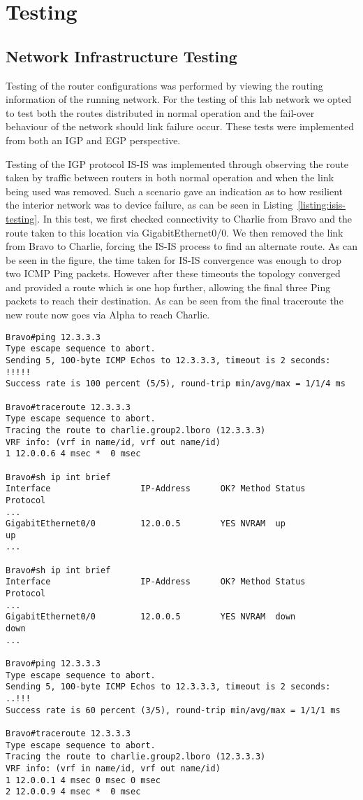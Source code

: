\chapter{Testing}
\section{Network Infrastructure Testing}
Testing of the router configurations was performed by viewing the routing
information of the running network. For the testing of this lab network we
opted to test both the routes distributed in normal operation and the fail-over
behaviour of the network should link failure occur. These tests were
implemented from both an IGP and EGP perspective.

Testing of the IGP protocol IS-IS was implemented through observing the route
taken by traffic between routers in both normal operation and when the link
being used was removed. Such a scenario gave an indication as to how resilient
the interior network was to device failure, as can be seen in
Listing~\ref{listing:isis-testing}. In this test, we first checked connectivity
to Charlie from Bravo and the route taken to this location via GigabitEthernet0/0. We then
removed the link from Bravo to Charlie, forcing the IS-IS process to find an
alternate route. As can be seen in the figure, the time taken for IS-IS
convergence was enough to drop two ICMP Ping packets. However after these
timeouts the topology converged and provided a route which is one hop further,
allowing the final three Ping packets to reach their destination. As can be
seen from the final traceroute the new route now goes via Alpha to reach
Charlie.

\begin{lstlisting}[caption={Testing of IS-IS reaction to link failure}, label={listing:isis-testing}]
Bravo#ping 12.3.3.3
Type escape sequence to abort.
Sending 5, 100-byte ICMP Echos to 12.3.3.3, timeout is 2 seconds:
!!!!!
Success rate is 100 percent (5/5), round-trip min/avg/max = 1/1/4 ms

Bravo#traceroute 12.3.3.3
Type escape sequence to abort.
Tracing the route to charlie.group2.lboro (12.3.3.3)
VRF info: (vrf in name/id, vrf out name/id)
1 12.0.0.6 4 msec *  0 msec

Bravo#sh ip int brief
Interface                  IP-Address      OK? Method Status                Protocol
...
GigabitEthernet0/0         12.0.0.5        YES NVRAM  up                    up
...

Bravo#sh ip int brief
Interface                  IP-Address      OK? Method Status                Protocol
...
GigabitEthernet0/0         12.0.0.5        YES NVRAM  down                  down
...

Bravo#ping 12.3.3.3
Type escape sequence to abort.
Sending 5, 100-byte ICMP Echos to 12.3.3.3, timeout is 2 seconds:
..!!!
Success rate is 60 percent (3/5), round-trip min/avg/max = 1/1/1 ms

Bravo#traceroute 12.3.3.3
Type escape sequence to abort.
Tracing the route to charlie.group2.lboro (12.3.3.3)
VRF info: (vrf in name/id, vrf out name/id)
1 12.0.0.1 4 msec 0 msec 0 msec
2 12.0.0.9 4 msec *  0 msec
\end{lstlisting}

